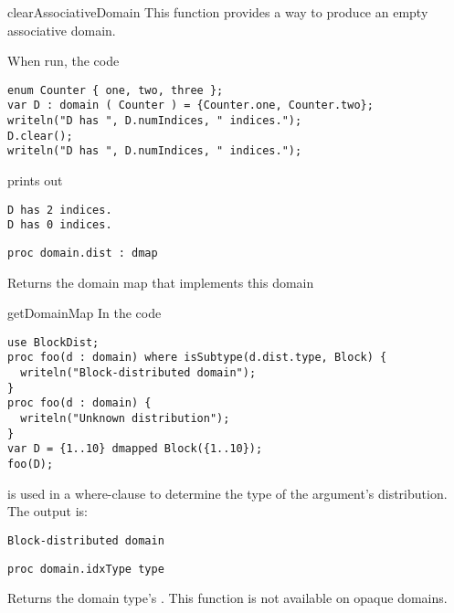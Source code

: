 \begin{chapelexample}{clearAssociativeDomain}
This function provides a way to produce an empty associative domain.

When run, the code
\begin{chapel}
\begin{verbatim}
enum Counter { one, two, three };
var D : domain ( Counter ) = {Counter.one, Counter.two};
writeln("D has ", D.numIndices, " indices.");
D.clear();
writeln("D has ", D.numIndices, " indices.");
\end{verbatim}
\end{chapel}
prints out
\begin{chapelprintoutput}
\begin{verbatim}
D has 2 indices.
D has 0 indices.
\end{verbatim}
\end{chapelprintoutput}
\end{chapelexample}

\begin{protohead}
\begin{verbatim}
proc domain.dist : dmap
\end{verbatim}
\end{protohead}
\begin{protobody}
Returns the domain map that implements this domain
\end{protobody}

\begin{chapelexample}{getDomainMap}
In the code
\begin{chapel}
\begin{verbatim}
use BlockDist;
proc foo(d : domain) where isSubtype(d.dist.type, Block) {
  writeln("Block-distributed domain");
}
proc foo(d : domain) {
  writeln("Unknown distribution");
}
var D = {1..10} dmapped Block({1..10});
foo(D);
\end{verbatim}
\end{chapel}
 is used in a where-clause to determine the type of the argument's
distribution. The output is:
\begin{chapelprintoutput}
\begin{verbatim}
Block-distributed domain
\end{verbatim}
\end{chapelprintoutput}
\end{chapelexample}

\begin{protohead}
\begin{verbatim}
proc domain.idxType type
\end{verbatim}
\end{protohead}
\begin{protobody}
Returns the domain type's .
This function is not available on opaque domains.
\end{protobody}

